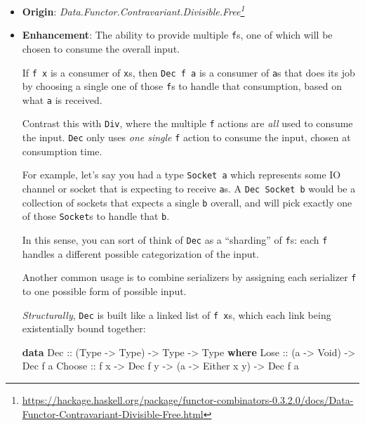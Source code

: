 \documentclass[]{article}
\newenvironment{Shaded}{}{}
\newcommand{\DataTypeTok}[1]{\textcolor[rgb]{0.56,0.13,0.00}{#1}}
\newcommand{\KeywordTok}[1]{\textcolor[rgb]{0.00,0.44,0.13}{\textbf{#1}}}
\newcommand{\NormalTok}[1]{#1}
\newcommand{\OtherTok}[1]{\textcolor[rgb]{0.00,0.44,0.13}{#1}}
\renewcommand{\href}[2]{#2\footnote{\url{#1}}}
\begin{document}
\begin{itemize}
\item
  \textbf{Origin}:
  \emph{\href{https://hackage.haskell.org/package/functor-combinators-0.3.2.0/docs/Data-Functor-Contravariant-Divisible-Free.html}{Data.Functor.Contravariant.Divisible.Free}}
\item
  \textbf{Enhancement}: The ability to provide multiple \texttt{f}s, one of
  which will be chosen to consume the overall input.

  If \texttt{f\ x} is a consumer of \texttt{x}s, then \texttt{Dec\ f\ a} is a
  consumer of \texttt{a}s that does its job by choosing a single one of those
  \texttt{f}s to handle that consumption, based on what \texttt{a} is received.

  Contrast this with \texttt{Div}, where the multiple \texttt{f} actions are
  \emph{all} used to consume the input. \texttt{Dec} only uses \emph{one single}
  \texttt{f} action to consume the input, chosen at consumption time.

  For example, let's say you had a type \texttt{Socket\ a} which represents some
  IO channel or socket that is expecting to receive \texttt{a}s. A
  \texttt{Dec\ Socket\ b} would be a collection of sockets that expects a single
  \texttt{b} overall, and will pick exactly one of those \texttt{Socket}s to
  handle that \texttt{b}.

  In this sense, you can sort of think of \texttt{Dec} as a ``sharding'' of
  \texttt{f}s: each \texttt{f} handles a different possible categorization of
  the input.

  Another common usage is to combine serializers by assigning each serializer
  \texttt{f} to one possible form of possible input.

  \emph{Structurally}, \texttt{Dec} is built like a linked list of
  \texttt{f\ x}s, which each link being existentially bound together:

\begin{Shaded}
\begin{Highlighting}[]
\KeywordTok{data} \DataTypeTok{Dec}\OtherTok{ ::}\NormalTok{ (}\DataTypeTok{Type} \OtherTok{{-}>} \DataTypeTok{Type}\NormalTok{) }\OtherTok{{-}>} \DataTypeTok{Type} \OtherTok{{-}>} \DataTypeTok{Type} \KeywordTok{where}
    \DataTypeTok{Lose}\OtherTok{   ::}\NormalTok{ (a }\OtherTok{{-}>} \DataTypeTok{Void}\NormalTok{) }\OtherTok{{-}>} \DataTypeTok{Dec}\NormalTok{ f a}
    \DataTypeTok{Choose}\OtherTok{ ::}\NormalTok{ f x }\OtherTok{{-}>} \DataTypeTok{Dec}\NormalTok{ f y }\OtherTok{{-}>}\NormalTok{ (a }\OtherTok{{-}>} \DataTypeTok{Either}\NormalTok{ x y) }\OtherTok{{-}>} \DataTypeTok{Dec}\NormalTok{ f a}
\end{Highlighting}
\end{Shaded}


\end{itemize}
\end{document}
